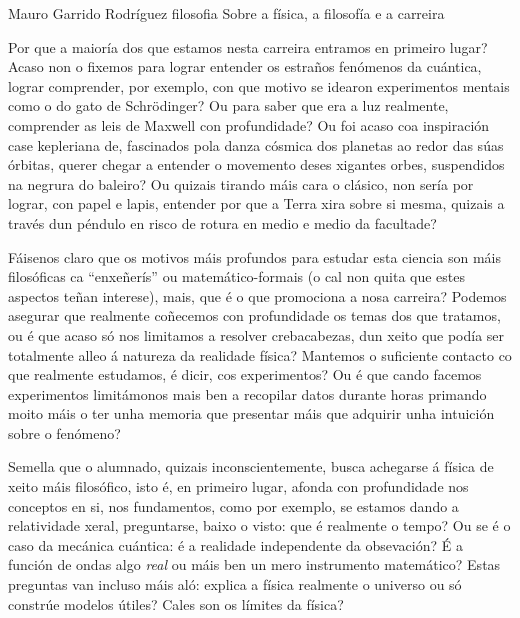 \Titular*%
{Física e filosofía: Irmás}
{Mauro Garrido Rodríguez}
{filosofia}
{Sobre a física, a filosofía e a carreira}

\begin{multicols}{2}

Por que a maioría dos que estamos nesta carreira entramos en primeiro lugar?
Acaso non o fixemos para lograr entender os estraños fenómenos da cuántica,
lograr comprender, por exemplo, con que motivo se idearon experimentos mentais
como o do gato de Schrödinger? Ou para saber que era a luz realmente,
comprender as leis de Maxwell con profundidade? Ou foi acaso coa inspiración
case kepleriana de, fascinados pola danza cósmica dos planetas ao redor das
súas órbitas, querer chegar a entender o movemento deses xigantes orbes,
suspendidos na negrura do baleiro? Ou quizais tirando máis cara o clásico, non
sería por lograr, con papel e lapis, entender por que a Terra xira sobre si
mesma, quizais a través dun péndulo en risco de rotura en medio e medio da
facultade?

Fáisenos claro que os motivos máis profundos para estudar esta
ciencia son máis filosóficas ca ``enxeñerís'' ou matemático-formais (o cal non
quita que estes aspectos teñan interese), mais, que é o que promociona a nosa
carreira? Podemos asegurar que realmente coñecemos con profundidade os temas
dos que tratamos, ou é que acaso só nos limitamos a resolver crebacabezas, dun
xeito que podía ser totalmente alleo á natureza da realidade física? Mantemos o
suficiente contacto co que realmente estudamos, é dicir, cos experimentos? Ou é
que cando facemos experimentos limitámonos mais ben a recopilar datos durante
horas primando moito máis o ter unha memoria que presentar máis que adquirir
unha intuición sobre o fenómeno?

Semella que o alumnado, quizais
inconscientemente, busca achegarse á física de xeito máis filosófico, isto é,
en primeiro lugar, afonda con profundidade nos conceptos en si, nos
fundamentos, como por exemplo, se estamos dando a relatividade xeral,
preguntarse, baixo o visto: que é realmente o tempo? Ou se é o caso da mecánica
cuántica: é a realidade independente da obsevación? É a función de ondas algo
\textit{real} ou máis ben un mero instrumento matemático? Estas preguntas van
incluso máis aló: explica a física realmente o universo ou só constrúe modelos
útiles? Cales son os límites da física?


\end{multicols}
